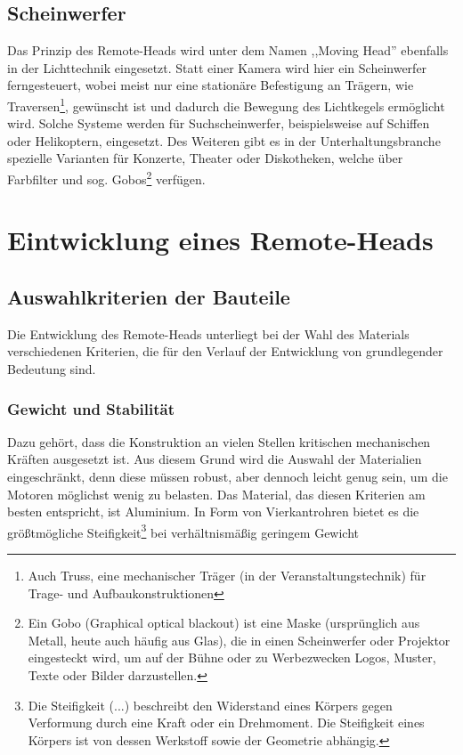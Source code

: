 \documentclass[a4paper, 12pt, bibtotocnumbered, liststotocnumbered]{scrartcl}
\begin{document}
	\subsection{Scheinwerfer}
	Das Prinzip des Remote-Heads wird unter dem Namen ,,Moving Head” ebenfalls in der Lichttechnik eingesetzt. Statt einer Kamera wird hier ein Scheinwerfer ferngesteuert, wobei meist nur eine stationäre Befestigung an Trägern, wie Traversen\footnote{Auch Truss, eine mechanischer Träger (in der Veranstaltungstechnik) für Trage- und Aufbaukonstruktionen}, gewünscht ist und dadurch die Bewegung des Lichtkegels ermöglicht wird. Solche Systeme werden für Suchscheinwerfer, beispielsweise auf Schiffen oder Helikoptern, eingesetzt. Des Weiteren gibt es in der Unterhaltungsbranche spezielle Varianten für Konzerte, Theater oder Diskotheken, welche über Farbfilter und sog. Gobos\footnote{Ein Gobo (Graphical optical blackout) ist eine Maske (ursprünglich aus Metall, heute auch häufig aus Glas), die in einen Scheinwerfer oder Projektor eingesteckt wird, um auf der Bühne oder zu Werbezwecken Logos, Muster, Texte oder Bilder darzustellen.} verfügen.

	\section{Eintwicklung eines Remote-Heads}
	\subsection{Auswahlkriterien der Bauteile}
	Die Entwicklung des Remote-Heads unterliegt bei der Wahl des Materials verschiedenen Kriterien, die für den Verlauf der Entwicklung von grundlegender Bedeutung sind.

	\subsubsection{Gewicht und Stabilität}
	Dazu gehört, dass die Konstruktion an vielen Stellen kritischen mechanischen Kräften ausgesetzt ist. Aus diesem Grund wird die Auswahl der Materialien eingeschränkt, denn diese müssen robust, aber dennoch leicht genug sein, um die Motoren möglichst wenig zu belasten. Das Material, das diesen Kriterien am besten entspricht, ist Aluminium. In Form von Vierkantrohren bietet es die größtmögliche Steifigkeit\footnote{Die Steifigkeit (...) beschreibt den Widerstand eines Körpers gegen Verformung durch eine Kraft oder ein Drehmoment. Die Steifigkeit eines Körpers ist von dessen Werkstoff sowie der Geometrie abhängig.} bei verhältnismäßig geringem Gewicht
\end{document}
